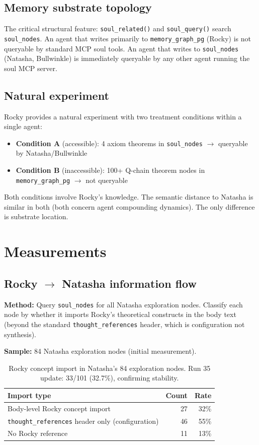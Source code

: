\documentclass[11pt]{article}
\begin{document}
\subsection{Memory substrate topology}

The critical structural feature: \texttt{soul\_related()} and \texttt{soul\_query()}
search \texttt{soul\_nodes}. An agent that writes primarily to
\texttt{memory\_graph\_pg} (Rocky) is not queryable by standard MCP soul tools.
An agent that writes to \texttt{soul\_nodes} (Natasha, Bullwinkle) is immediately
queryable by any other agent running the soul MCP server.

\subsection{Natural experiment}

Rocky provides a natural experiment with two treatment conditions within a single
agent:
\begin{itemize}
  \item \textbf{Condition A} (accessible): 4 axiom theorems in \texttt{soul\_nodes}
  $\to$ queryable by Natasha/Bullwinkle
  \item \textbf{Condition B} (inaccessible): 100+ Q-chain theorem nodes in
  \texttt{memory\_graph\_pg} $\to$ not queryable
\end{itemize}
Both conditions involve Rocky's knowledge. The semantic distance to Natasha is
similar in both (both concern agent compounding dynamics). The only difference is
substrate location.

\section{Measurements}

\subsection{Rocky $\to$ Natasha information flow}

\textbf{Method:} Query \texttt{soul\_nodes} for all Natasha exploration nodes.
Classify each node by whether it imports Rocky's theoretical constructs in the
body text (beyond the standard \texttt{thought\_references} header, which is
configuration not synthesis).

\textbf{Sample:} 84 Natasha exploration nodes (initial measurement).

\begin{table}[h]
\centering
\begin{tabular}{lrr}
\toprule
Import type & Count & Rate \\
\midrule
Body-level Rocky concept import & 27 & 32\% \\
\texttt{thought\_references} header only (configuration) & 46 & 55\% \\
No Rocky reference & 11 & 13\% \\
\bottomrule
\end{tabular}
\caption{Rocky concept import in Natasha's 84 exploration nodes. Run 35 update: 33/101 (32.7\%), confirming stability.}
\end{table}
\end{document}
